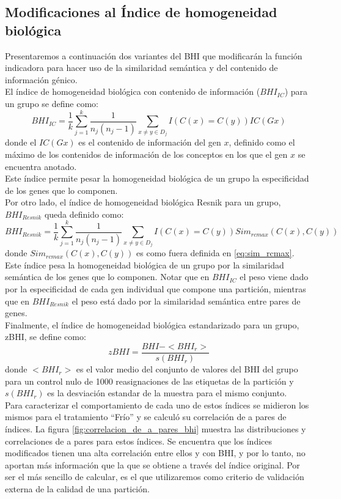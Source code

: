\subsection{Modificaciones al Índice de homogeneidad biológica}
Presentaremos a continuación dos variantes del BHI que modificarán la función indicadora para hacer uso de la similaridad semántica y del contenido de información génico.\\
El índice de homogeneidad biológica con contenido de información ($BHI_{IC}$) para un grupo se define como:
\begin{equation}
	BHI_{IC} = \frac{1}{k}\sum\limits_{j=1}^k\frac{1}{n_j(n_j-1)}\sum\limits_{x\neq y\in D_j}I(C(x)=C(y))IC(Gx)
\end{equation}
donde el $IC(Gx)$ es el contenido de información del gen $x$, definido como el máximo de los contenidos de información de los conceptos en los que el gen $x$ se encuentra anotado.\\
Este índice permite pesar la homogeneidad biológica de un grupo la especificidad de los genes que lo componen.\\
Por otro lado, el índice de homogeneidad biológica Resnik para un grupo, $BHI_{Resnik}$ queda definido como:
\begin{equation}
	BHI_{Resnik} = \frac{1}{k}\sum\limits_{j=1}^k\frac{1}{n_j(n_j-1)}\sum\limits_{x\neq y\in D_j}I(C(x)=C(y))Sim_{rcmax}(C(x), C(y))
\end{equation}
donde $Sim_{rcmax}(C(x), C(y))$ es como fuera definida en \ref{eq:sim_rcmax}.\\
Este índice pesa la homogeneidad biológica de un grupo por la similaridad semántica de los genes que lo componen. Notar que en $BHI_{IC}$ el peso viene dado por la especificidad de cada gen individual que compone una partición, mientras que en $BHI_{Resnik}$ el peso está dado por la similaridad semántica entre pares de genes.\\
Finalmente, el índice de homogeneidad biológica estandarizado para un grupo, zBHI, se define como:
\begin{equation}
	zBHI = \frac{BHI-<BHI_r>}{s(BHI_r)}
\end{equation}
donde $<BHI_r>$ es el valor medio del conjunto de valores del BHI del grupo para un control nulo de 1000 reasignaciones de las etiquetas de la partición y $s(BHI_r)$ es la desviación estandar de la muestra para el mismo conjunto.\\
Para caracterizar el comportamiento de cada uno de estos índices se midieron los mismos para el tratamiento ``Frío'' y se calculó su correlación de a pares de índices. La figura \ref{fig:correlacion_de_a_pares_bhi} muestra las distribuciones y correlaciones de a pares para estos índices. Se encuentra que los índices modificados tienen una alta correlación entre ellos y con BHI, y por lo tanto, no aportan más información que la que se obtiene a través del índice original. Por ser el más sencillo de calcular, es el que utilizaremos como criterio de validación externa de la calidad de una partición.
